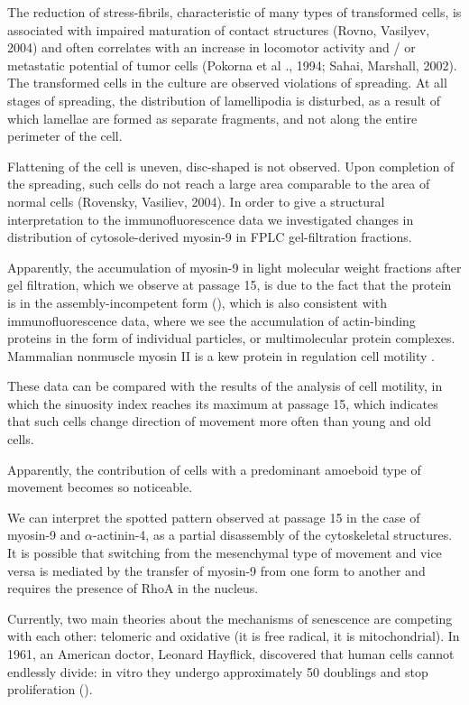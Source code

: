 \documentclass[alpha-refs]{wiley-article}
\begin{document}
The reduction of stress-fibrils, characteristic of many types of transformed cells, is associated with impaired maturation of contact structures (Rovno, Vasilyev, 2004) and often correlates with an increase in locomotor activity and / or metastatic potential of tumor cells (Pokorna et al ., 1994; Sahai, Marshall, 2002).
The transformed cells in the culture are observed violations of spreading.
At all stages of spreading, the distribution of lamellipodia is disturbed, as a result of which lamellae are formed as separate fragments, and not along the entire perimeter of the cell.

Flattening of the cell is uneven, disc-shaped is not observed.
Upon completion of the spreading, such cells do not reach a large area comparable to the area of normal cells (Rovensky, Vasiliev, 2004).
In order to give a structural interpretation to the immunofluorescence data we investigated changes in distribution of cytosole-derived myosin-9 in FPLC gel-filtration fractions.

Apparently, the accumulation of myosin-9 in light molecular weight fractions after gel filtration, which we observe at passage 15, is due to the fact that the protein is in the assembly-incompetent form (\cite{vicente2009non}), which is also consistent with immunofluorescence data, where we see the accumulation of actin-binding proteins in the form of individual particles, or multimolecular protein complexes.
Mammalian nonmuscle myosin II is a kew protein in regulation cell motility \cite{shutova2018mammalian}.

These data can be compared with the results of the analysis of cell motility, in which the sinuosity index reaches its maximum at passage 15, which indicates that such cells change direction of movement more often than young and old cells.

Apparently, the contribution of cells with a predominant amoeboid type of movement becomes so noticeable.

We can interpret the spotted pattern observed at passage 15 in the case of myosin-9 and $\alpha$-actinin-4, as a partial disassembly of the cytoskeletal structures.
It is possible that switching from the mesenchymal type of movement and vice versa is mediated by the transfer of myosin-9 from one form to another and requires the presence of RhoA in the nucleus.

Currently, two main theories about the mechanisms of senescence are competing with each other: telomeric and oxidative (it is free radical, it is mitochondrial). In 1961, an American doctor, Leonard Hayflick, discovered that human cells cannot endlessly divide: in vitro they undergo approximately 50 doublings and stop proliferation (\cite{hayflick1961serial}).
\end{document}
